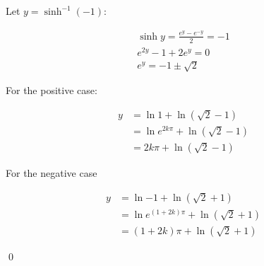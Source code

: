 \documentclass[12pt]{article}
\begin{document}
Let $y = \sinh^{-1}{(-1)}$:

\begin{equation}
    \begin{split}
        \sinh{y} = \frac{e^{y} - e^{-y}}{2} = -1 \\
        e^{2y} - 1 + 2e^{y} = 0 \\
        e^{y} = -1 \pm \sqrt{2}
    \end{split}
\end{equation}

\begin{correction}
    For the positive case:

    \begin{equation*}
        \begin{split}
            y &= \ln{1} + \ln{(\sqrt{2} - 1)} \\
            &= \ln{e^{2k\pi}} + \ln{(\sqrt{2} - 1)} \\
            &= 2k\pi + \ln{(\sqrt{2} - 1)}
        \end{split}
    \end{equation*}

    For the negative case

    \begin{equation*}
        \begin{split}
            y &= \ln{-1} + \ln{(\sqrt{2} + 1)} \\
            &= \ln{e^{(1 + 2k)\pi}} + \ln{(\sqrt{2} + 1)} \\
            &= (1 + 2k)\pi + \ln{(\sqrt{2} + 1)}
        \end{split}
    \end{equation*}
\end{correction}
\qed
\end{document}
